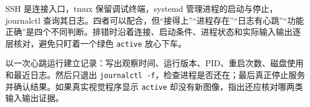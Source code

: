 \begin{conclusion}
SSH 是连接入口，tmux 保留调试终端，systemd 管理进程的启动与停止，journalctl 查询其日志。四者可以配合，但“接得上”“进程存在”“日志有心跳”“功能正确”是四个不同判断。排错时沿着连接、启动条件、进程状态和实际输入输出逐层核对，避免只盯着一个绿色 \texttt{active} 放心下车。
\end{conclusion}

\begin{exercise}\label{ex:deploy-ops}
以一次心跳运行建立记录：写出观察时间、运行版本、PID、重启次数、磁盘使用和最近日志。然后只退出 \texttt{journalctl -f}，检查进程是否还在；最后真正停止服务并确认结果。如果真实视觉程序显示 \texttt{active} 却没有新图像，指出还应核对哪两类输入输出证据。
\end{exercise}
